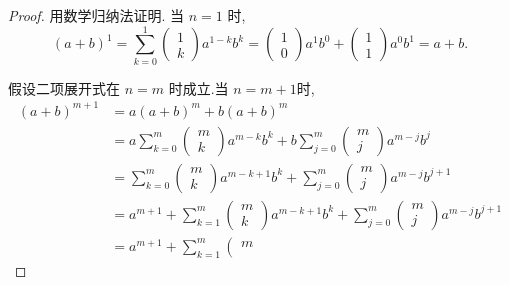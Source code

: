 \documentclass[main]{subfiles}
\begin{document}
\iffalse 
\begin{proof}
        用数学归纳法证明. 当 $n=1$ 时,
       $$
       (a+b)^1=\sum_{k=0}^1\left(\begin{array}{l}
       1 \\
       k
       \end{array}\right) a^{1-k} b^k=\left(\begin{array}{l}
       1 \\
       0
       \end{array}\right) a^1 b^0+\left(\begin{array}{l}
       1 \\
       1
       \end{array}\right) a^0 b^1=a+b.
       $$
       
       假设二项展开式在 $n=m$ 时成立.当 $n=m+1$时,
       $$
       \begin{aligned}
       (a+b)^{m+1} & =a(a+b)^m+b(a+b)^m \\
       & =a \sum_{k=0}^m\left(\begin{array}{c}
       m \\
       k
       \end{array}\right) a^{m-k} b^k+b \sum_{j=0}^m\left(\begin{array}{c}
       m \\
       j
       \end{array}\right) a^{m-j} b^j \\
       & =\sum_{k=0}^m\left(\begin{array}{c}
       m \\
       k
       \end{array}\right) a^{m-k+1} b^k+\sum_{j=0}^m\left(\begin{array}{c}
       m \\
       j
       \end{array}\right) a^{m-j} b^{j+1} \\
       & =a^{m+1}+\sum_{k=1}^m\left(\begin{array}{c}
       m \\
       k
       \end{array}\right) a^{m-k+1} b^k+\sum_{j=0}^m\left(\begin{array}{c}
       m \\
       j
       \end{array}\right) a^{m-j} b^{j+1}  \\
       & =a^{m+1}+\sum_{k=1}^m\left(\begin{array}{c}
       m \\

\end{array}
\end{aligned}$$
\end{proof}
\end{document}
